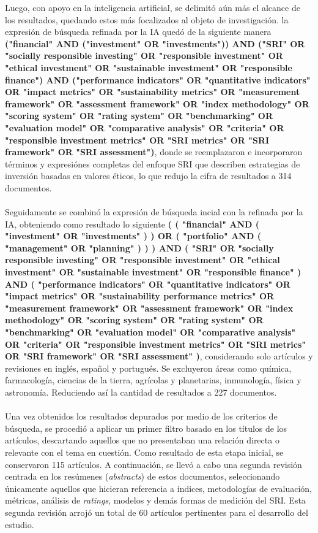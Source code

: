 \documentclass[12pt]{article}
\begin{document}
Luego, con apoyo en la inteligencia artificial, se delimit\'o a\'un m\'as el alcance de los resultados, quedando estos m\'as focalizados al objeto de investigaci\'on. la expresi\'on de b\'usqueda refinada por la IA qued\'o de la siguiente manera \textbf{("financial" AND ("investment" OR "investments")) AND ("SRI" OR "socially responsible investing" OR "responsible investment" OR "ethical investment" OR "sustainable investment" OR "responsible finance") AND ("performance indicators" OR "quantitative indicators" OR "impact metrics" OR "sustainability metrics" OR "measurement framework" OR "assessment framework" OR "index methodology" OR "scoring system" OR "rating system" OR "benchmarking" OR "evaluation model" OR "comparative analysis" OR "criteria" OR "responsible investment metrics" OR "SRI metrics" OR "SRI framework" OR "SRI assessment")}, donde se reemplazaron e incorporaron t\'erminos y expresi\'ones completas del enfoque SRI que describen estrategias de inversi\'on basadas en valores \'eticos, lo que redujo la cifra de resultados a 314 documentos.\\
\\
Seguidamente se combin\'o la expresi\'on de b\'usqueda incial con la refinada por la IA, obteniendo como resultado lo siguiente \textbf{( ( "financial" AND ( "investment" OR "investments" ) ) OR ( "portfolio" AND ( "management" OR "planning" ) ) ) AND ( "SRI" OR "socially responsible investing" OR "responsible investment" OR "ethical investment" OR "sustainable investment" OR "responsible finance" ) AND ( "performance indicators" OR "quantitative indicators" OR "impact metrics" OR "sustainability performance metrics" OR "measurement framework" OR "assessment framework" OR "index methodology" OR "scoring system" OR "rating system" OR "benchmarking" OR "evaluation model" OR "comparative analysis" OR "criteria" OR "responsible investment metrics" OR "SRI metrics" OR "SRI framework" OR "SRI assessment" )}, considerando solo art\'iculos y revisiones en ingl\'es, español y portugu\'es. Se excluyeron \'areas como qu\'imica, farmacolog\'ia, ciencias de la tierra, agr\'icolas y planetarias, inmunolog\'ia, f\'isica y astronom\'ia. Reduciendo as\'i la cantidad de resultados a 227 documentos.\\
\\
Una vez obtenidos los resultados depurados por medio de los criterios de b\'usqueda, se procedi\'o a aplicar un primer filtro basado en los t\'itulos de los art\'iculos, descartando aquellos que no presentaban una relaci\'on directa o relevante con el tema en cuesti\'on. Como resultado de esta etapa inicial, se conservaron 115 art\'iculos. A continuaci\'on, se llev\'o a cabo una segunda revisi\'on centrada en los res\'umenes (\textit{abstracts}) de estos documentos, seleccionando \'unicamente aquellos que hicieran referencia a \'indices, metodolog\'ias de evaluaci\'on, m\'etricas, an\'alisis de \textit{ratings}, modelos y dem\'as formas de medici\'on del SRI. Esta segunda revisi\'on arroj\'o un total de 60 art\'iculos pertinentes para el desarrollo del estudio.\\
\end{document}
